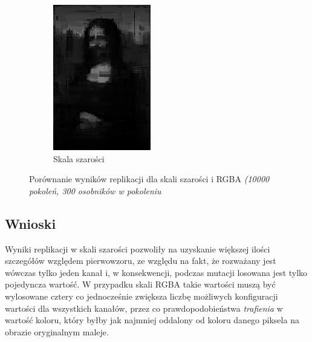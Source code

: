 \begin{figure}[!htb]
\begin{subfigure}[b]{0.3\textwidth}
         \includegraphics[width=\textwidth]{images/mona/10000_300_2/img_0_best.png}
         \caption{Skala szarości}
    \end{subfigure}
    \caption{Porównanie wyników replikacji dla skali szarości i RGBA \textit{ (10000 pokoleń, 300 osobników w pokoleniu}}
    \label{fig:scale_1}
\end{figure}

\subsection{Wnioski}
Wyniki replikacji w skali szarości pozwoliły na uzyskanie większej ilości szczegółów względem pierwowzoru, ze względu na fakt, że rozważany jest wówczas tylko jeden kanał i, w konsekwencji, podczas mutacji losowana jest tylko pojedyncza wartość. W przypadku skali RGBA takie wartości muszą być wylosowane cztery co jednocześnie zwiększa liczbę możliwych konfiguracji wartości dla wszystkich kanałów, przez co prawdopodobieństwa \textit{trafienia} w wartość koloru, który byłby jak najmniej oddalony od koloru danego piksela na obrazie oryginalnym maleje.

